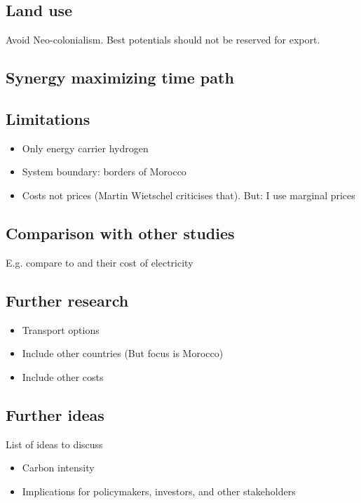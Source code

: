 
\subsection{Land use}
Avoid Neo-colonialism. Best potentials should not be reserved for export.

\subsection{Synergy maximizing time path}

\subsection{Limitations}
\label{subsec:limitations}
\begin{itemize}
    \item Only energy carrier hydrogen
    \item System boundary: borders of Morocco
    \item Costs not prices (Martin Wietschel criticises that). But: I use marginal prices
\end{itemize}

\subsection{Comparison with other studies}
E.g. compare to \cite{Hampp2021} and their cost of electricity

\subsection{Further research}
\begin{itemize}
    \item Transport options
    \item Include other countries (But focus is Morocco)
    \item Include other costs
\end{itemize}

\subsection{Further ideas}
List of ideas to discuss
\begin{itemize}
    \item Carbon intensity
    \item Implications for policymakers, investors, and other stakeholders
\end{itemize}